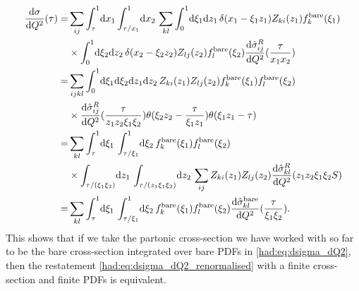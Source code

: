 \documentclass[../main.tex]{subfiles}
\begin{document}
\begin{align}
  \nonumber
  \d[Q^2]{\sigma}(\tau) = & \sum_ {ij} \integral[_\tau^1]{x_1}\!\integral[_{\tau/x_1}^1]{x_2} \sum_{kl} \integral[_0^1]{\xi_1\mathrm{d}z_1} \delta(x_1 - \xi_1 z_1) Z_{ki}(z_1) f_k^\text{bare}(\xi_1)          \\
  \nonumber
                          & \times \integral[_0^1]{\xi_2\mathrm{d}z_2} \delta(x_2 - \xi_2 z_2) Z_{lj}(z_2) f_l^\text{bare}(\xi_2) \d[Q^2]{\hat\sigma^R_{ij}}(\frac{\tau}{x_1 x_2})                              \\
  \nonumber
  =                       & \sum_{ijkl} \integral[_0^1]{\xi_1 \mathrm{d}\xi_2 \mathrm{d}z_1 \mathrm{d}z_2} Z_{ki}(z_1) Z_{lj}(z_2) f_k^\text{bare}(\xi_1) f_l^\text{bare}(\xi_2)                                \\
  \nonumber
                          & \times \d[Q^2]{\hat\sigma_{ij}^R}(\frac{\tau}{z_1 z_2 \xi_1 \xi_2}) \theta(\xi_2 z_2 - \frac{\tau}{\xi_1 z_1}) \theta(\xi_1 z_1 - \tau)                                             \\
  \nonumber
  =                       & \sum_{kl} \integral[_\tau^1]{\xi_1} \integral[_{\tau/\xi_1}^1]{\xi_2} f_k^\text{bare}(\xi_1) f_l^\text{bare}(\xi_2)                                                                 \\
  \nonumber
                          & \times \integral[_{\tau/(\xi_1 \xi_2)}]{z_1} \integral[_{\tau/(z_1 \xi_1 \xi_2)}]{z_2} \sum_{ij} Z_{ki}(z_1) Z_{lj}(z_2) \d[Q^2]{\hat\sigma_{kl}^R}(z_1z_2 \xi_1\xi_2 S)            \\
  =                       & \sum_{kl} \integral[_\tau^1]{\xi_1} \integral[_{\tau/\xi_1}^1]{\xi_2} f_k^\text{bare}(\xi_1) f_l^\text{bare}(\xi_2) \d[Q^2]{\hat\sigma^\text{bare}_{kl}}(\frac{\tau}{\xi_1 \xi_2}).
\end{align}
This shows that if we take the partonic cross-section we have worked with so far to be the bare cross-section integrated over bare PDFs in \cref{had:eq:dsigma_dQ2}, then the restatement \cref{had:eq:dsigma_dQ2_renormalised} with a finite cross-section and finite PDFs is equivalent.
\medskip
\end{document}
